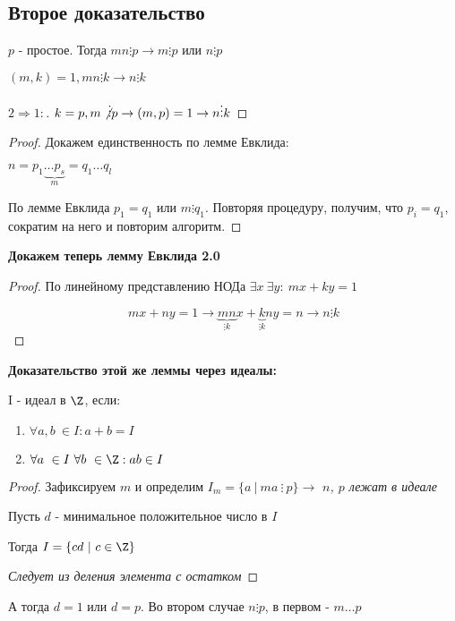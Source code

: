 \subsection{Второе доказательство}

\begin{lemma}[Евклида]
  $p$ - простое. Тогда $mn \vdots p \to m \vdots p$ или $n \vdots p$
\end{lemma}

\begin{lemma}[Евклида 2.0]
 $(m, k) = 1, mn \vdots k \to n \vdots k$
\end{lemma}

\begin{proof}[$2 \Longrightarrow 1:$]
  $ k = p, m \not \vdots p \to (m, p) = 1 \to n \vdots k $
\end{proof}

\begin{proof}
  Докажем единственность по лемме Евклида:

  $n = p_1 \underbrace{\dots p_s}_{m} = q_1 \dots q_l$

  По лемме Евклида $p_1 = q_1$ или $m \vdots q_1$. Повторяя процедуру, получим, что $p_i = q_1$, сократим на него и повторим алгоритм.
\end{proof}

\newpage

\textbf{Докажем теперь лемму Евклида 2.0}
\begin{proof}
  По линейному представлению НОДа $\exists x \ \exists y: \ mx + ky = 1$

  $$mx + ny = 1 \to \underbrace{mn}_{\vdots k}x + \underbrace{k}_{\vdots k}ny = n \to n \vdots k$$
\end{proof}

\textbf{Доказательство этой же леммы через идеалы:}

\begin{definition}
  I - идеал в $\Z$, если:
  \begin{enumerate}
    \item $\forall a, b \ \in I: a + b = I$
    \item $\forall a \ \in I \  \forall b \ \in \Z: ab \in I$

  \end{enumerate}
\end{definition}

\begin{proof}
  Зафиксируем $m$ и определим $I_m = \{ a \ | \ ma \ \vdots\  p\} \to$
\textit{$n$, $p$ лежат в идеале} 

  \begin{lemma}
    Пусть $d$ - минимальное положительное число в $I$

    Тогда $I = \{cd \ |\  c \in \Z\}$
  
  \end{lemma}
  \textit{Следует из деления элемента с остатком}
\end{proof}

А тогда $d = 1$ или $d = p$. Во втором случае $n \vdots p$, в первом - $m \dots p$


